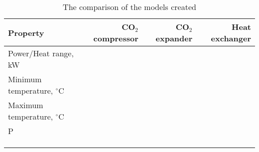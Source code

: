 \begin{table}
\label{tab:DiscussionComparison}
\caption{The comparison of the models created}
\begin{center}
\begin{tabulary}{0.9\textwidth}{LRRR}
\toprule
Property 	&	CO$_2$ compressor & CO$_2$	expander & Heat exchanger \\
\midrule
Power/Heat range, kW& & & \\
Minimum temperature, $^\circ$C& & & \\
Maximum temperature, $^\circ$C& & & \\
P& & & \\
& & & \\
& & & \\
& & & \\
\bottomrule
\end{tabulary}
\end{center}
\end{table}